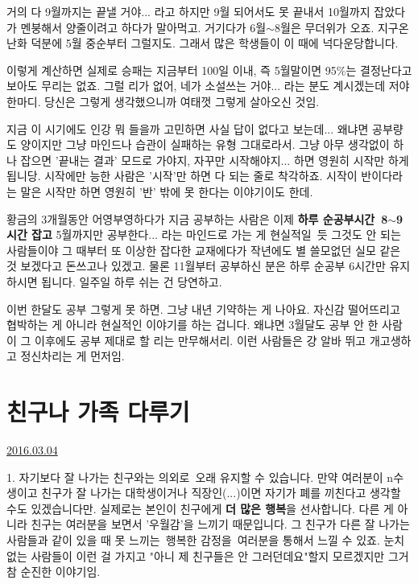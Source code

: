 거의 다 9월까지는 끝낼 거야... 라고 하지만 9월 되어서도 못 끝내서 10월까지 잡았다가 멘붕해서 양줄이려고 하다가 말아먹고.
거기다가 6월$\sim$8월은 무더위가 오죠. 지구온난화 덕분에 5월 중순부터 그럴지도.
그래서 많은 학생들이 이 때에 넉다운당합니다.
\vspace{5mm}

이렇게 계산하면 실제로 승패는 지금부터 100일 이내, 즉 5월말이면 95$\%$는 결정난다고 보아도 무리는 없죠.
그럴 리가 없어, 네가 소설쓰는 거야... 라는 분도 계시겠는데 저야 한마디. 당신은 그렇게 생각했으니까 여태껏 그렇게 살아오신 것임.
\vspace{5mm}

지금 이 시기에도 인강 뭐 들을까 고민하면 사실 답이 없다고 보는데... 왜냐면 공부량도 양이지만 그냥 마인드나 습관이 실패하는 유형 그대로라서.
그냥 아무 생각없이 하나 잡으면 '끝내는 결과' 모드로 가야지, 자꾸만 시작해야지... 하면 영원히 시작만 하게 됩니당.
시작에만 능한 사람은 '시작'만 하면 다 되는 줄로 착각하죠. 시작이 반이다라는 말은 시작만 하면 영원히 '반' 밖에 못 한다는 이야기이도 한데.
\vspace{5mm}

황금의 3개월동안 어영부영하다가 지금 공부하는 사람은 이제 \textbf{하루 순공부시간 8$\sim$9시간 잡고} 5월까지만 공부한다... 라는 마인드로 가는 게 현실적일 듯
그것도 안 되는 사람들이야 그 때부터 또 이상한 잡다한 교재에다가 작년에도 별 쓸모없던 실모 같은 것 보겠다고 돈쓰고나 있겠고.
물론 11월부터 공부하신 분은 하루 순공부 6시간만 유지하시면 됩니다. 일주일 하루 쉬는 건 당연하고.
\vspace{5mm}

이번 한달도 공부 그렇게 못 하면. 그냥 내년 기약하는 게 나아요. 자신감 떨어뜨리고 협박하는 게 아니라 현실적인 이야기를 하는 겁니다.
왜냐면 3월달도 공부 안 한 사람이 그 이후에도 공부 제대로 할 리는 만무해서리. 이런 사람들은 걍 알바 뛰고 개고생하고 정신차리는 게 먼저임.
\vspace{5mm}






\section{친구나 가족 다루기}
\href{https://www.kockoc.com/Apoc/663083}{2016.03.04}

\vspace{5mm}

\item 1. 자기보다 잘 나가는 친구와는 의외로 오래 유지할 수 있습니다.
만약 여러분이 n수생이고 친구가 잘 나가는 대학생이거나 직장인(...)이면 자기가 폐를 끼친다고 생각할 수도 있겠습니다만.
실제로는 본인이 친구에게 \textbf{더 많은 행복}을 선사합니다.
다른 게 아니라 친구는 여러분을 보면서 '우월감'을 느끼기 때문입니다.
그 친구가 다른 잘 나가는 사람들과 같이 있을 때 못 느끼는 행복한 감정을 여러분을 통해서 느낄 수 있죠.
눈치없는 사람들이 이런 걸 가지고 "아니 제 친구들은 안 그러던데요"할지 모르겠지만 그거 참 순진한 이야기임.
\vspace{5mm}

